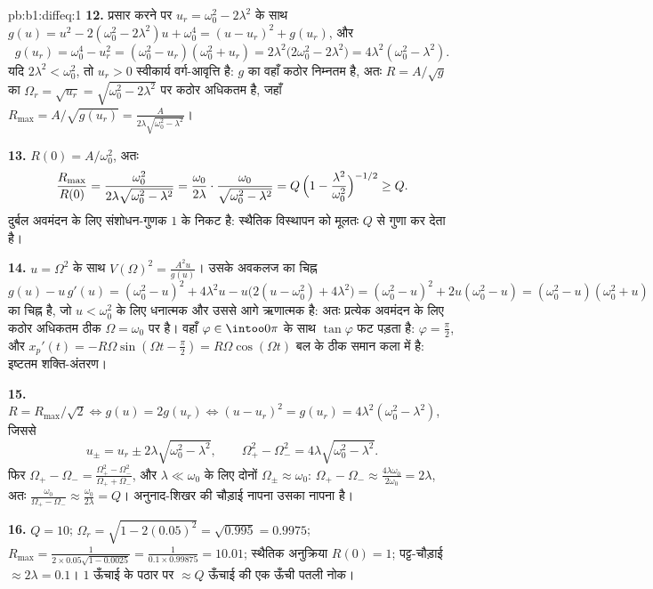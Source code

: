 \begin{solution}{pb:b1:diffeq:1}
\textbf{12.} प्रसार करने पर $u_r = \omega_0^2 - 2\lambda^2$ के साथ $g(u) =
u^2 - 2(\omega_0^2 - 2\lambda^2)u + \omega_0^4 = (u - u_r)^2 + g(u_r)$, और
\[
g(u_r) = \omega_0^4 - u_r^2 = (\omega_0^2 - u_r)(\omega_0^2 +
u_r) = 2\lambda^2\bigl(2\omega_0^2 - 2\lambda^2\bigr) =
4\lambda^2(\omega_0^2 - \lambda^2) .
\]
यदि $2\lambda^2 < \omega_0^2$, तो $u_r > 0$ स्वीकार्य वर्ग-आवृत्ति है: $g$
का वहाँ कठोर निम्नतम है, अतः $R = A/\sqrt g$ का $\Omega_r = \sqrt{u_r} =
\sqrt{\omega_0^2 - 2\lambda^2}$ पर कठोर अधिकतम है, जहाँ $R_{\max} =
A/\sqrt{g(u_r)} = \frac{A}{2\lambda\sqrt{\omega_0^2 - \lambda^2}}$।

\textbf{13.} $R(0) = A/\omega_0^2$, अतः
\[
\frac{R_{\max}}{R(0)}
= \frac{\omega_0^2}{2\lambda\sqrt{\omega_0^2 - \lambda^2}}
= \frac{\omega_0}{2\lambda}\cdot
\frac{\omega_0}{\sqrt{\omega_0^2 - \lambda^2}}
= Q\,\Bigl(1 - \frac{\lambda^2}{\omega_0^2}\Bigr)^{-1/2}
\geq Q .
\]
दुर्बल अवमंदन के लिए संशोधन-गुणक $1$ के निकट है:  स्थैतिक विस्थापन को
मूलतः $Q$ से गुणा कर देता है।

\textbf{14.} $u = \Omega^2$ के साथ $V(\Omega)^2 = \frac{A^2 u}{g(u)}$। उसके
अवकलज का चिह्न $g(u) - u\,g'(u) = (\omega_0^2 - u)^2 + 4\lambda^2 u -
u\bigl(2(u - \omega_0^2) + 4\lambda^2\bigr) = (\omega_0^2 - u)^2 +
2u(\omega_0^2 - u) = (\omega_0^2 - u)(\omega_0^2 + u)$ का चिह्न है, जो $u <
\omega_0^2$ के लिए धनात्मक और उससे आगे ऋणात्मक है: अतः प्रत्येक अवमंदन के
लिए कठोर अधिकतम ठीक $\Omega = \omega_0$ पर है। वहाँ $\varphi \in \intoo0\pi$
के साथ $\tan\varphi$ फट पड़ता है: $\varphi = \frac\pi2$, और $x_p'(t) =
-R\Omega\sin(\Omega t - \frac\pi2) = R\Omega\cos(\Omega t)$ बल के ठीक समान
कला में है: इष्टतम शक्ति-अंतरण।

\textbf{15.} $R = R_{\max}/\sqrt2 \iff g(u) = 2g(u_r) \iff (u - u_r)^2 =
g(u_r) = 4\lambda^2(\omega_0^2 - \lambda^2)$, जिससे
\[
u_\pm = u_r \pm 2\lambda\sqrt{\omega_0^2 - \lambda^2},
\qquad
\Omega_+^2 - \Omega_-^2 = 4\lambda\sqrt{\omega_0^2 - \lambda^2} .
\]
फिर $\Omega_+ - \Omega_- = \frac{\Omega_+^2 - \Omega_-^2}{\Omega_+ +
\Omega_-}$, और $\lambda \ll \omega_0$ के लिए दोनों $\Omega_\pm \approx
\omega_0$: $\Omega_+ - \Omega_- \approx \frac{4\lambda\omega_0}{2\omega_0} =
2\lambda$, अतः $\frac{\omega_0}{\Omega_+ - \Omega_-} \approx
\frac{\omega_0}{2\lambda} = Q$। अनुनाद-शिखर की चौड़ाई नापना उसका 
नापना है।

\textbf{16.} $Q = 10$; $\Omega_r = \sqrt{1 - 2(0.05)^2} = \sqrt{0.995} =
0.9975$; $R_{\max} = \frac1{2 \times 0.05 \sqrt{1 - 0.0025}} = \frac1{0.1
\times 0.99875} = 10.01$; स्थैतिक अनुक्रिया $R(0) = 1$; पट्ट-चौड़ाई $\approx
2\lambda = 0.1$। $1$ ऊँचाई के पठार पर $\approx Q$ ऊँचाई की एक ऊँची पतली नोक।


\end{solution}
